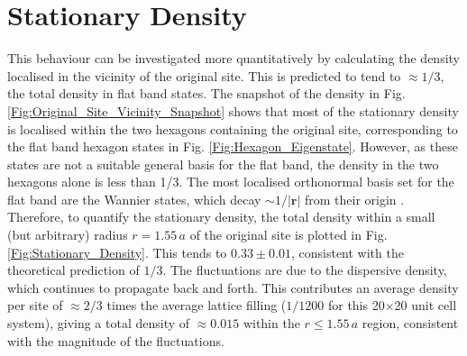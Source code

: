 \section{Stationary Density}\label{Sec:Staionary_Density_1p}

This behaviour can be investigated more quantitatively by calculating the density localised in the vicinity of the original site. This is predicted to tend to $\approx 1/3$, the total density in flat band states. The snapshot of the density in Fig. \ref{Fig:Original_Site_Vicinity_Snapshot} shows that most of the stationary density is localised within the two hexagons containing the original site, corresponding to the flat band hexagon states in Fig. \ref{Fig:Hexagon_Eigenstate}. However, as these states are not a suitable general basis for the flat band, the density in the two hexagons alone is less than 1/3. The most localised orthonormal basis set for the flat band are the Wannier states, which decay $\sim 1/|\textbf{r}|$ from their origin \cite{Huber}. Therefore, to quantify the stationary density, the total density within a small (but arbitrary) radius $r=1.55\,a$ of the original site is plotted in Fig. \ref{Fig:Stationary_Density}. This tends to $0.33 \pm 0.01$, consistent with the theoretical prediction of $1/3$. The fluctuations are due to the dispersive density, which continues to propagate back and forth. This contributes an average density per site of $\approx 2/3$ times the average lattice filling ($1/1200$ for this 20$\times$20 unit cell system), giving a total density of $\approx0.015$ within the $r\leq1.55\,a$ region, consistent with the magnitude of the fluctuations. 

\vspace{1cm}

